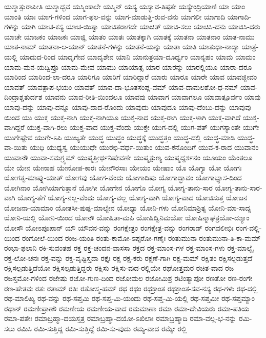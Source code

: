 {ಯಸ್ಮಾತ್ಸುರಾಪೀತಿ
ಯಸ್ಮಾದ್ಭವ
ಯಸ್ಮಿಂಕಾಲೇ
ಯಸ್ಮಿನ್
ಯಸ್ಯ
ಯಸ್ಯಾವ-ತಿಷ್ಠತೇ
ಯಸ್ಯೇಂದ್ರಿಯಾಣಿ
ಯಾ
ಯಾಂ
ಯಾಂತಿ
ಯಾಃ
ಯಾಗ-ಗಳಿಂದ
ಯಾಗ-ಫಲ-ವನ್ನು
ಯಾಗ-ಮಾಡುತ್ತಿ-ರುವ-ವನು
ಯಾಗಲೀ
ಯಾಗಾದಿ
ಯಾಗಾದಿ-ಗಳನ್ನು
ಯಾಗಿ
ಯಾಚ-ಕಸ್ಯ
ಯಾಚ-ಯಿತ್ವಾ
ಯಾಚಿತರಾಗದೇ
ಯಾಚಿತ್
ಯಾಚಿ-ಸಲು
ಯಾಚಿಸಿ-ದನು
ಯಾಚಿಸಿ-ದರು
ಯಾಚೇ
ಯಾಜಕಂ
ಯಾಜಕಃ
ಯಾಜ್ಞಿ
ಯಾತಂ
ಯಾತಃ
ಯಾತಕ್ಕಾಗಿ
ಯಾತಕ್ಕೆ
ಯಾತನಾ
ಯಾತನಾಂ
ಯಾತ-ನಾಮು
ಯಾತ-ನಾಮ್
ಯಾತನಾ-ಲ-ಯಾನ್
ಯಾತನೆ-ಗಳನ್ನು
ಯಾತನೆ-ಯನ್ನು
ಯಾತಾ
ಯಾತಿ
ಯಾತುಧಾ-ನಾದ್ಯಾ
ಯಾತ್ರೆ-ಯಲ್ಲಿ
ಯಾದುದ-ರಿಂದ
ಯಾದೃಗೇವ
ಯಾದೃಶೇನ
ಯಾನಿ
ಯಾನುತ್ರಯಾ-ದೂರ್ಧ್ವಂ
ಯಾನ್ಯಹಂ
ಯಾಮ
ಯಾಮಂ
ಯಾಮ-ಮನ-ಯದ್ವಿಪ್ರೊ
ಯಾಮ-ಮೇವ
ಯಾಮು
ಯಾಯಾತ್ಸ
ಯಾರ
ಯಾರನ್ನು
ಯಾರಲ್ಲಿಯೂ
ಯಾರಾ-ದರೂ
ಯಾರಿಂದ
ಯಾರಿಂದ-ಲಾ-ದರೂ
ಯಾರಿಗೂ
ಯಾರಿಗೆ
ಯಾರಿದ್ದಾರೆ
ಯಾರು
ಯಾರೂ
ಯಾರೇ
ಯಾವ
ಯಾವಜ್ಜೀವಂ
ಯಾವತ್
ಯಾವತ್ಪಾಪ-ಭಯಂ
ಯಾವತ್
ಯಾವ-ದಾ-ಭೂತಸಂಪ್ಲ-ವಮ್
ಯಾವ-ದಾಮಲಶೋ-ಧ-ನಮ್
ಯಾವ-ದಿಂದ್ರಾಶ್ಚತುರ್ದಶ
ಯಾವನು
ಯಾವ-ರೀತಿ-ಯಿಂದಲೂ
ಯಾವವು
ಯಾವಾಗ
ಯಾವಾಗಲೂ
ಯಾವಾತ್ಪೂರ್ವಂ
ಯಾವು
ಯಾವು-ದನ್ನು
ಯಾವು-ದನ್ನೂ
ಯಾವು-ದಾದ-ರೊಂದು
ಯಾವುದು
ಯಾವುದೂ
ಯಾವು-ದೆಂಬು-ದನ್ನು
ಯಾವುವು
ಯಿಂದ
ಯು
ಯುಕ್ತ
ಯುಕ್ತ-ನಾಗಿ
ಯುಕ್ತ-ನಾಗಿಯೂ
ಯುಕ್ತ-ನಾದ
ಯುಕ್ತ-ರಾಗಿ
ಯುಕ್ತ-ಳಾಗಿ
ಯುಕ್ತ-ವಾಗಿದೆ
ಯುಕ್ತ-ವಾಗಿದ್ದರೆ
ಯುಕ್ತ-ವಾಗಿ-ರಲು
ಯುಕ್ತ-ವಾದ
ಯುಕ್ತ-ವೆಂದು
ಯುಕ್ತೇ
ಯುಗ-ದಲ್ಲಿ
ಯುಗ-ಪತ್
ಯುಗಸ್ಯಾಂತೇ
ಯುಗೇ
ಯುಗೇಷ್ಟೇವ
ಯುಗೇ-ಽಪಿ
ಯುಜ್ಯತೇ
ಯುದ್ಧ
ಯುದ್ಧಂ
ಯುದ್ಧಕ್ಕೆ
ಯುದ್ಧತ್ತಂ
ಯುದ್ಧ-ದಲ್ಲಿ
ಯುದ್ಧ-ಮಾಡಿ
ಯುದ್ಧ-ವಾ-ಯಿತು
ಯುಧಿ
ಯುಧ್ಯಸ್ವ
ಯುಯುಧೇ
ಯುರಭಿ-ವರ್ಧ-ಯಿತುಂ
ಯುವ-ಕನೊಂದಿಗೆ
ಯುವ-ಕ-ರಾದ
ಯುವಾನಂ
ಯುವಾನೌ
ಯುವಾ-ಸಮಗ್ರ್ಯಮ್
ಯುಷ್ಮತ್ತೀರ್ಥನಿಷೇವಣೇ
ಯುಷ್ಮತ್ಪುಣ್ಯ
ಯುಷ್ಮದ್ದರ್ಶನಂ
ಯೂಯಂ
ಯೆಂತಲೂ
ಯೇ
ಯೇನ
ಯೇನಾಹ
ಯೇನೋಪ-ಕಾರಃ
ಯೇನೌರಸಾಃ
ಯೇಯಂ
ಯೇಷಾಂ
ಯೊ
ಯೊಗ್ಯಾ
ಯೋ
ಯೋಗಃ
ಯೋಗತ್ವ-ಮಾಪ್ನು-ಯಾತ್
ಯೋಗವು
ಯೋಗ-ವೆಂದು
ಯೋಗಾದಿಷು
ಯೋಗಾದ್ಭಾವಂ
ಯೋಗಾಭ್ಯಾಸ-ದಿಂದ
ಯೋಗಿನಾಂ
ಯೋಗಿಯಾಗುತ್ತಾನೆ
ಯೋಗೀ
ಯೋಗೇನ
ಯೋಗೊ
ಯೋಗ್ಯ
ಯೋಗ್ಯ-ತಾನು-ಸಾರ
ಯೋಗ್ಯ-ತಾನು-ಸಾರ-ವಾಗಿ
ಯೋಗ್ಯ-ತೆಗೆ
ಯೋಗ್ಯ-ನಲ್ಲ-ವೆಂದು
ಯೋಗ್ಯ-ವಲ್ಲ
ಯೋಗ್ಯ-ವಾಗಿ
ಯೋಗ್ಯ-ವಾದ
ಯೋಚಿಸುತ್ತ
ಯೋಜನ
ಯೋಜನಾ-ಯಾಮಾಂ
ಯೋತಸೀ-ಪುಷ್ಪ-ಮಾಲ್ಯೇನ
ಯೋಧ್ಯಾ
ಯೋನಿ-ಗಳು
ಯೋನಿಮಾಶ್ರಿತ್ಯ
ಯೋನಿ-ಮಾ-ಸಾದ್ಯ
ಯೋನಿ-ಯಲ್ಲಿ
ಯೋನಿ-ಯಿಂದ
ಯೋನೌ
ಯೋಷಿತಾ-ಮಪಿ
ಯೋಷಿದ್ವಿನಿಮಯೋ
ಯೋಷಿನ್ಮಾಘತ್ರಯೋ-ದಶ್ಯಾಂ
ಯೋಸೌ
ಯೋಽಪೂಪಾನ್
ಯೌ
ಯೌವನ-ವನ್ನು
ರಂಗಕ್ಷೇತ್ರಂ
ರಂಗಕ್ಷೇತ್ರ-ವನ್ನು
ರಂಗರಾಡ್
ರಂಗವಲೀಭಿಃ
ರಂಗ-ವಲ್ಲಿ-ಯಿಂದ
ರಂಗೋಲೆ-ಯಿಂದ
ರಂಜ-ಯಂತಿ
ರಂತು-ಕಾಮೋ-ಽಪ್ಸರೋ-ಗಣೈಃ
ರಂತುಮುನಾ
ರಂತುಮುನಾ-ತಿ-ಕಾ-ಮಮ್
ರಂಭಾ-ಫಲಾನಿ
ರಕಿ-ಸುವಂತಹ
ರಕ್ತ
ರಕ್ತ-ಚಂದನ-ವಾಸಸಾ
ರಕ್ತದ
ರಕ್ತ-ಮಾಂಸ-ಗಳ
ರಕ್ತ-ಮಾಂಸ-ಗಳು
ರಕ್ತ-ಮಾಲ್ಯೈ
ರಕ್ತ-ಲೋ-ಚನಃ
ರಕ್ತ-ವನ್ನು
ರಕ್ತ-ವೃಷ್ಟಿಸ್ತದಾ
ರಕ್ತೈಃ
ರಕ್ಷ
ರಕ್ಷ-ಕರು
ರಕ್ಷಣೆ-ಗಾಗಿ
ರಕ್ಷ-ಮಮ್
ರಕ್ಷಿತಂ
ರಕ್ಷಿಸಲ್ಪಡುತ್ತದೆ
ರಕ್ಷಿಸಲ್ಪಡುತ್ತಿದೆಯೋ
ರಕ್ಷಿಸಲ್ಪಡುತ್ತಿದ್ದರು
ರಕ್ಷಿಸು
ರಕ್ಷಿಸು-ವುದ-ರಲ್ಲಿಯೇ
ರಘೋತ್ತಮರ
ರಚಿತ-ವಾದ
ರಜ
ರಜಸ್ತಮೋ-ಗಳಿಂದ
ರಜೇಷು
ರಜೋ-ಗುಣ-ದಿಂದ
ರಜೋಮಲ
ರಜೋಮಿಶ್ರ
ರಟಿಂತ್ಯಾಪೋ
ರಣತೋ
ರಣ-ರಂಗೇ
ರಣ-ಹೇತವಃ
ರತಃ
ರತಾಮ್
ರತಿಃ
ರತೋಸ್ಮ-ಹಮ್
ರಥ
ರಥಂ
ರಥಕ್ರಾಂತ
ರಥಕ್ರಾಂತ-ಸವ-ನಸ್ಯ
ರಥ-ಗಳು
ರಥ-ದಲ್ಲಿ
ರಥ-ಮಾಲಿಖ್ಯ
ರಥ-ವನ್ನು
ರಥ-ಸಪ್ತಮಿ
ರಥ-ಸಪ್ತ-ಮಿ-ಯಂದು
ರಥ-ಸಪ್ತ-ಮಿ-ಯಲ್ಲಿ
ರಥ-ಸಪ್ತಮೀ
ರಥ-ಸಪ್ತಮ್ಯಾಂ
ರಥಾನ್
ರಮಣೀಪ್ರಾಣೌ
ರಮಣೀಯ
ರಮಣೀಯ-ವಾದ
ರಮಮಾಣಾ
ರಮಾ
ರಮಾ-ದೇವಿಯರು
ರಮಾ-ಪತಿಯ
ರಮಾ-ಪತೇಃ
ರಮಾಬ್ರಹ್ಮಾ-ದಯಸ್ತತ್ರ
ರಮಾಬ್ರಹ್ಮಾ-ದಯೋ-ಽಖಿಲಾಃ
ರಮಾಬ್ರಹ್ಮಾದಿ
ರಮಾ-ವಲ್ಲ-ಭ-ನನ್ನು
ರಮಿ-ಸಲು
ರಮಿಸಿ
ರಮಿ-ಸುತ್ತಿದ್ದ
ರಮಿ-ಸುತ್ತಿದ್ದೆ
ರಮಿ-ಸು-ವುದು
ರಮ್ಯ-ವಾದ
ರಮ್ಯೇ
ರಲ್ಲಿ
}
